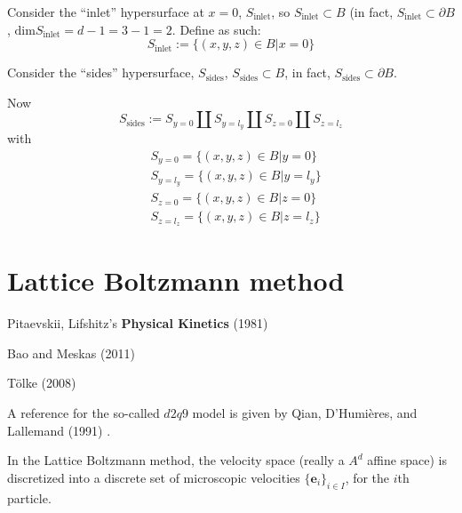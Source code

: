 \documentclass[10pt]{amsart}
\begin{document}
\begin{multicols*}{2}
Consider the ``inlet'' hypersurface at $x=0$, $S_{\text{inlet}}$, so $S_{\text{inlet}} \subset B$ (in fact, $S_{\text{inlet}} \subset \partial B$, $\text{dim}S_{\text{inlet}} = d-1=3-1=2$.  Define as such:
\begin{equation}
S_{\text{inlet}} := \lbrace (x,y,z) \in B | x=0 \rbrace
\end{equation}

Consider the ``sides'' hypersurface, $S_{\text{sides}}$, $S_{\text{sides}} \subset B$, in fact, $S_{\text{sides}} \subset \partial B$.

Now
\begin{equation}
S_{\text{sides}} := S_{y=0} \coprod S_{y=l_y } \coprod S_{z=0} \coprod S_{z=l_z}
\end{equation}
with
\begin{equation}
  \begin{aligned}
    & S_{y=0} = \lbrace (x,y,z) \in  B | y= 0 \rbrace \\ 
    & S_{y=l_y} = \lbrace (x,y,z) \in  B | y= l_y \rbrace \\ 
    & S_{z=0} = \lbrace (x,y,z) \in  B | z= 0 \rbrace \\ 
    & S_{z=l_z} = \lbrace (x,y,z) \in  B | z= l_z \rbrace 
    \end{aligned}
  \end{equation}

\section{Lattice Boltzmann method}





Pitaevskii, Lifshitz's \textbf{Physical Kinetics} (1981) \cite{PL1981}






Bao and Meskas (2011) \cite{BaMe2011}



T\"{o}lke (2008) \cite{Tolk2008}

A reference for the so-called $d2q9$ model is given by Qian, D'Humi\`{e}res, and Lallemand (1991) \cite{QDL1991}.  


In the Lattice Boltzmann method, the velocity space (really a $A^d$ affine space) is discretized into a discrete set of microscopic velocities $\lbrace \mathbf{e}_i \rbrace_{i \in I}$, for the $i$th particle.  


\end{multicols*}
\end{document}
